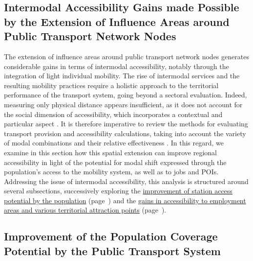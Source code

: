 \begin{refsegment}
\section{Intermodal Accessibility Gains made Possible by the Extension of Influence Areas around Public Transport Network Nodes
    \label{chap5:accessibilite-intermodale-extension-aire-influence}
    }

The extension of influence areas around public transport network nodes generates considerable gains in terms of \gls{intermodal accessibility}, notably through the integration of light individual mobility. The rise of intermodal services and the resulting mobility practices require a holistic approach to the territorial performance of the transport system, going beyond a sectoral evaluation. Indeed, measuring only physical distance appears insufficient, as it does not account for the social dimension of accessibility, which incorporates a contextual and particular aspect \textcolor{blue}{\autocite[3]{lhostis_definir_2010}}. It is therefore imperative to review the methods for evaluating transport provision and accessibility calculations, taking into account the variety of modal combinations and their relative effectiveness \textcolor{blue}{\autocite[111]{chapelon_transports_2016}}. In this regard, we examine in this section how this spatial extension can improve regional accessibility in light of the potential for modal shift expressed through the population's access to the mobility system, as well as to jobs and \acrfull{POIs}. Addressing the issue of intermodal accessibility, this analysis is structured around several subsections, successively exploring the \hyperref[chap5:couverture-population]{improvement of station access potential by the population} (page~\pageref{chap5:couverture-population}) and the \hyperref[chap5:accessibilite-emplois]{gains in accessibility to employment areas and various territorial attraction points} (page~\pageref{chap5:accessibilite-emplois}).%

\subsection{Improvement of the Population Coverage Potential by the Public Transport System
    \label{chap5:couverture-population}
    }


\end{refsegment}
